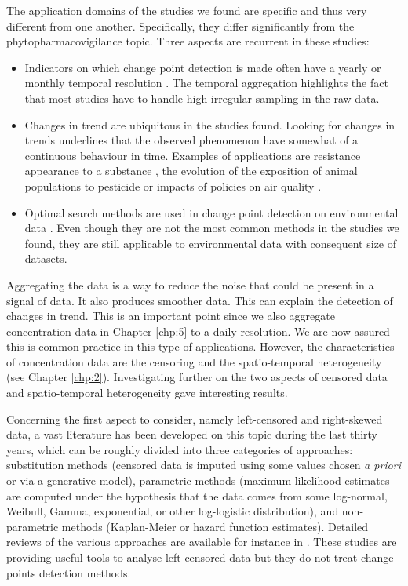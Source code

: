 The application domains of the studies we found are specific and thus very different from one another. Specifically, they differ significantly from the phytopharmacovigilance topic. Three aspects are recurrent in these studies: 
\begin{itemize}
\item Indicators on which change point detection is made often have a yearly or monthly temporal resolution \citep{Ko2017,Ryberg2020,FOMBY2006}. The temporal aggregation highlights the fact that most studies have to handle high irregular sampling in the raw data. 
\item Changes in trend are ubiquitous in the studies found. Looking for changes in trends underlines that the observed phenomenon have somewhat of a continuous behaviour in time. Examples of applications are resistance appearance to a substance \citep{Solla2010}, the evolution of the exposition of animal populations to pesticide \citep{Menger2022} or impacts of policies on air quality \citep{FOMBY2006}.
\item Optimal search methods are used in change point detection on environmental data \citep{BUNCE_2018,Ryberg2020}. Even though they are not the most common methods in the studies we found, they are still applicable to environmental data with consequent size of datasets. \end{itemize}

Aggregating the data is a way to reduce the noise that could be present in a signal of data. It also produces smoother data. This can explain the detection of changes in trend. This is an important point since we also aggregate concentration data in Chapter \ref{chp:5} to a daily resolution. We are now assured this is common practice in this type of applications. 
However, the characteristics of concentration data are the censoring and the spatio-temporal heterogeneity (see Chapter \ref{chp:2}).
Investigating further on the two aspects of censored data and spatio-temporal heterogeneity gave interesting results. 

Concerning the first aspect to consider, namely left-censored and right-skewed data, a vast literature has been developed on this topic during the last thirty years, which can be roughly divided into three categories of approaches: substitution methods (censored data is imputed using some values chosen \emph{a priori} or via a generative model), parametric methods (maximum likelihood estimates are computed under the hypothesis that the data comes from some log-normal, Weibull, Gamma, exponential, or other log-logistic distribution), and non-parametric methods (Kaplan-Meier or hazard function estimates). Detailed reviews of the various approaches are available  for instance in \cite{Authority2010,Hewett2007ACO,Mitra2008,Canales2018,Antweiler2008,Gillespie2010,shoari2018toward}. These studies are providing useful tools to analyse left-censored data but they do not treat change points detection methods. 

